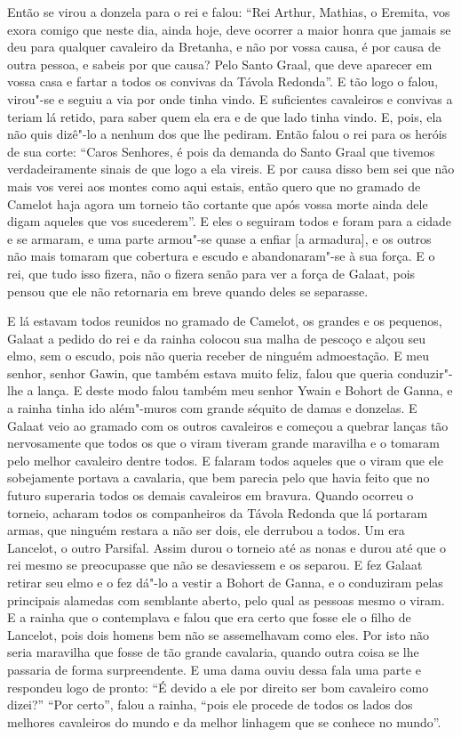 Então se virou a donzela para o rei e falou: “Rei Arthur, Mathias, o Eremita, vos
exora comigo que neste dia, ainda hoje, deve ocorrer a maior honra que jamais
se deu para qualquer cavaleiro da Bretanha, e não por vossa causa, é por causa
de outra pessoa, e sabeis por que causa? Pelo Santo Graal, que deve aparecer em
vossa casa e fartar a todos os convivas da Távola Redonda”. E
tão logo o falou, virou"-se e seguiu a via por onde tinha vindo. E suficientes
cavaleiros e convivas a teriam lá retido, para saber quem ela era e de que lado
tinha vindo. E, pois, ela não quis dizê"-lo a nenhum dos que lhe pediram. Então
falou o rei para os heróis de sua corte: “Caros Senhores, é pois da demanda do
Santo Graal que tivemos verdadeiramente sinais de que logo a ela vireis. E por
causa disso bem sei que não mais vos verei aos montes como aqui estais, então
quero que no gramado de Camelot haja agora um torneio tão cortante que após
vossa morte ainda dele digam aqueles que vos sucederem”. E eles o seguiram
todos e foram para a cidade e se armaram, e uma parte armou"-se quase a enfiar [a armadura],
e os outros não mais tomaram que cobertura e escudo e abandonaram"-se à sua
força. E o rei, que tudo isso fizera, não o fizera senão para ver a força de
Galaat, pois pensou que ele não retornaria em breve quando deles se separasse. 

E lá estavam todos reunidos no gramado de Camelot, os grandes e os pequenos,
Galaat a pedido do rei e da rainha colocou sua malha de pescoço e alçou seu
elmo, sem o escudo, pois não queria receber de ninguém admoestação. E meu
senhor, senhor Gawin, que também estava muito feliz, falou que queria
conduzir"-lhe a lança. E deste modo falou também meu senhor Ywain e Bohort de
Ganna, e a rainha tinha ido além"-muros com grande séquito de damas e donzelas. 
E Galaat veio ao gramado com os outros cavaleiros e começou a quebrar
lanças tão nervosamente que todos os que o viram tiveram grande maravilha e o
tomaram pelo melhor cavaleiro dentre todos. E falaram todos aqueles que o viram
que ele sobejamente portava a cavalaria, que bem parecia pelo que havia feito
que no futuro superaria todos os demais cavaleiros em bravura. Quando ocorreu o
torneio, acharam todos os companheiros da Távola Redonda que lá portaram armas,
que ninguém restara a não ser dois, ele derrubou a todos. Um era Lancelot, o
outro Parsifal. Assim durou o torneio até as nonas e durou até que o rei mesmo
se preocupasse que não se desaviessem e os separou. E fez Galaat retirar seu
elmo e o fez dá"-lo a vestir a Bohort de Ganna, e o conduziram pelas
principais alamedas com semblante aberto, pelo qual as pessoas mesmo o viram. E
a rainha que o contemplava e falou que era certo que fosse ele o filho de
Lancelot, pois dois homens bem não se assemelhavam como eles. Por isto não
seria maravilha que fosse de tão grande cavalaria, quando outra coisa se lhe
passaria de forma surpreendente. E uma dama ouviu dessa fala uma parte e
respondeu logo de pronto: “É devido a ele por direito ser bom cavaleiro como
dizei?” “Por certo”, falou a rainha, “pois ele procede de todos os lados dos
melhores cavaleiros do mundo e da melhor linhagem que se conhece no mundo”. 


